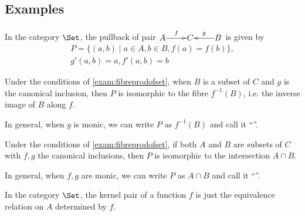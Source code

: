 \subsection{Examples}
  \begin{exam}\label{exam:fibreprodofset}
    In the category $\Set$, the pullback of pair $\xymatrix@1{A\ar[r]^{f}&C&B\ar[l]_{g}}$ is given by
    \begin{gather*}
      P=\{(a,b)\mid a\in A, b\in B, f(a)=f(b)\},\\
      g'(a,b)=a,f'(a,b)=b
    \end{gather*}
  \end{exam}
  \begin{exam}
    Under the conditions of \ref{exam:fibreprodofset}, when $B$ is a subset of $C$ and $g$ is the canonical inclusion, then $P$ is isomorphic to the fibre $f^{-1}(B)$, i.e. the inverse image of $B$ along $f$.
  \end{exam}
  \begin{rem}
    In general, when $g$ is monic, we can write $P$ as $f^{-1}(B)$ and call it ``''.
  \end{rem}
  \begin{exam}\label{exam:intersection=pullback}
    Under the conditions of \ref{exam:fibreprodofset}, if both $A$ and $B$ are subsets of $C$ with $f,g$ the canonical inclusions, then $P$ is isomorphic to the intersection $A\cap B$.
  \end{exam}
  \begin{rem}
    In general, when $f,g$ are monic, we can write $P$ as $A\cap B$ and call it ``''.
  \end{rem}
  \begin{exam}
    In the category $\Set$, the kernel pair of a function $f$ is just the equivalence relation on $A$ determined by $f$.
  \end{exam}
